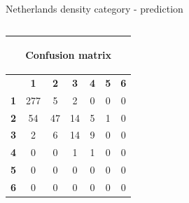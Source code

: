 \documentclass[c]{beamer}
\begin{document}
\begin{frame}
\begin{columns}
\begin{column}{0.5\textwidth}
\begin{overlayarea}{\linewidth}{4cm}
  \end{overlayarea}
  \begin{overlayarea}{\linewidth}{0.5cm}
    \centering
    \tiny Netherlands density category - prediction\par
  \end{overlayarea}
 \end{column}
\end{columns}
\begin{columns}
 \begin{column}{0.6\textwidth}
 \begin{overlayarea}{\linewidth}{2cm}
  \begin{table}
  \begin{center}
  \begin{adjustbox}{max width=0.6\textwidth}
  {\tiny
  \begin{tabular}{|c|c|c|c|c|c|c|}
    \hline
    \multicolumn{7}{|c|}{{\tiny \begin{bf}Confusion matrix\end{bf}}} \\
    \hline
     & \textbf{1} & \textbf{2} & \textbf{3} & \textbf{4} & \textbf{5} & \textbf{6}\\
    \hline
    \textbf{1} & 277 & 5 & 2 & 0 & 0 & 0\\
    \hline
    \textbf{2} & 54 & 47 & 14 & 5 & 1 & 0\\
    \hline
    \textbf{3} & 2 & 6 & 14 & 9 & 0 & 0\\
    \hline
    \textbf{4} & 0 & 0 & 1 & 1 & 0 & 0\\
    \hline
    \textbf{5} & 0 & 0 & 0 & 0 & 0 & 0\\
    \hline
    \textbf{6} & 0 & 0 & 0 & 0 & 0 & 0\\
    \hline
  \end{tabular}
  }
  \end{adjustbox}
  \end{center}
  \end{table}
 \end{overlayarea}
 \end{column}
 \begin{column}{0.6\textwidth}

\end{column}
\end{columns}
\end{frame}
\end{document}
